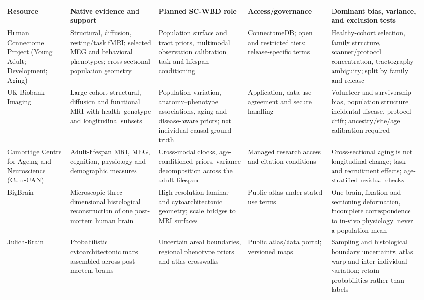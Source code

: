 \begin{table}[!h]
\centering
\footnotesize
\setlength{\tabcolsep}{3pt}
\renewcommand{\arraystretch}{1.08}
\begin{tabularx}{\textwidth}{@{}p{}p{}p{}p{}X@{}}
\toprule
\textbf{Resource} & \textbf{Native evidence and support} &
\textbf{Planned SC-WBD role} & \textbf{Access/governance} &
\textbf{Dominant bias, variance, and exclusion tests}\\
\midrule
Human Connectome Project (Young Adult; Development; Aging)
\citep{vanessen2013} &
Structural, diffusion, resting/task fMRI; selected MEG and behavioral
phenotypes; cross-sectional population geometry &
Population surface and tract priors, multimodal observation calibration,
task and lifespan conditioning &
ConnectomeDB; open and restricted tiers; release-specific terms &
Healthy-cohort selection, family structure, scanner/protocol concentration,
tractography ambiguity; split by family and release\\

UK Biobank Imaging &
Large-cohort structural, diffusion and functional MRI with health, genotype
and longitudinal subsets &
Population variation, anatomy--phenotype associations, aging and
disease-aware priors; not individual causal ground truth &
Application, data-use agreement and secure handling &
Volunteer and survivorship bias, population structure, incidental disease,
protocol drift; ancestry/site/age calibration required\\

Cambridge Centre for Ageing and Neuroscience (Cam-CAN)
\citep{taylor2017camcan} &
Adult-lifespan MRI, MEG, cognition, physiology and demographic measures &
Cross-modal clocks, age-conditioned priors, variance decomposition across
the adult lifespan &
Managed research access and citation conditions &
Cross-sectional aging is not longitudinal change; task and recruitment
effects; age-stratified residual checks\\

BigBrain \citep{amunts2013bigbrain} &
Microscopic three-dimensional histological reconstruction of one post-mortem
human brain &
High-resolution laminar and cytoarchitectonic geometry; scale bridges to MRI
surfaces &
Public atlas under stated use terms &
One brain, fixation and sectioning deformation, incomplete correspondence to
in-vivo physiology; never a population mean\\

Julich-Brain \citep{amunts2020julich} &
Probabilistic cytoarchitectonic maps assembled across post-mortem brains &
Uncertain areal boundaries, regional phenotype priors and atlas crosswalks &
Public atlas/data portal; versioned maps &
Sampling and histological boundary uncertainty, atlas warp and
inter-individual variation; retain probabilities rather than labels\\


\end{tabularx}
\end{table}
